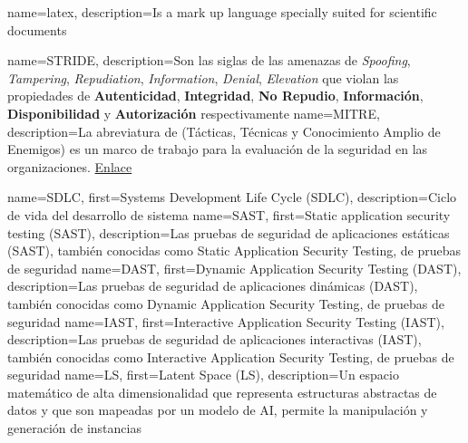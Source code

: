 \makeglossaries


    {name={latex},      description={Is a mark up language specially suited for scientific documents}}

   {name={STRIDE},     description={Son las siglas de las amenazas de \textit{Spoofing}, \textit{Tampering}, \textit{Repudiation}, \textit{Information}, \textit{Denial}, \textit{Elevation} que violan las propiedades de \textbf{Autenticidad}, \textbf{Integridad}, \textbf{No Repudio}, \textbf{Información}, \textbf{Disponibilidad} y \textbf{Autorización} respectivamente}}
    {name={MITRE},      description={La abreviatura de (Tácticas, Técnicas y Conocimiento Amplio de Enemigos) es un marco de trabajo para la evaluación de la seguridad en las organizaciones. \href{https://attack.mitre.org/}{Enlace}}}

     {name={SDLC},   first={Systems Development Life Cycle (SDLC)},           description={Ciclo de vida del desarrollo de sistema}}
     {name={SAST},   first={Static application security testing (SAST)},      description={Las pruebas de seguridad de aplicaciones estáticas (SAST), también conocidas como Static Application Security Testing, de pruebas de seguridad}}
     {name={DAST},   first={Dynamic Application Security Testing (DAST)},     description={Las pruebas de seguridad de aplicaciones dinámicas (DAST), también conocidas como Dynamic Application Security Testing, de pruebas de seguridad}}
     {name={IAST},   first={Interactive Application Security Testing (IAST)}, description={Las pruebas de seguridad de aplicaciones interactivas (IAST), también conocidas como Interactive Application Security Testing, de pruebas de seguridad}}
     {name={LS},   first={Latent Space (LS)}, description={Un espacio matemático de alta dimensionalidad que representa estructuras abstractas de datos y que son mapeadas por un modelo de AI, permite la manipulación y generación de instancias}}



